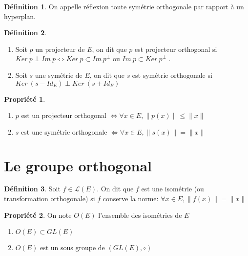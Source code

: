 \documentclass[fleqn]{article}
\theoremstyle{definition} \newtheorem*{defi}{D\'efinition}
\theoremstyle{definition} \newtheorem*{theo}{Th\'eor\`eme}
\theoremstyle{definition} \newtheorem*{coro}{Corollaire}
\theoremstyle{remark} \newtheorem*{rqs}{Remarques}
\theoremstyle{definition} \newtheorem*{prop}{Propri\'et\'e}
\begin{document}
\begin{defi}
	On appelle r\'eflexion toute sym\'etrie orthogonale par rapport \`a un hyperplan.
\end{defi}

\begin{defi} $ $
	\begin{enumerate}
		\item Soit $p$ un projecteur de $E$, on dit que $p$ est projecteur orthogonal si $Ker\ p \perp Im\  p \Leftrightarrow Ker\ p
			\subset Im\ p^\perp$ ou $ Im\ p \subset Ker\ p^\perp$ .
		\item Soit $s$ une sym\'etrie de $E$, on dit que $s$ est sym\'etrie orthogonale si $Ker\ (s-Id_E) \perp Ker\ (s + Id_E)$
	\end{enumerate}
\end{defi}

\begin{prop} $ $
	\begin{enumerate}
		\item $p$ est un projecteur orthogonal $\Leftrightarrow \forall x \in E, \|p(x)\| \leq \|x\|$
		\item $s$ est une sym\'etrie orthogonale $\Leftrightarrow \forall x \in E, \|s(x)\| = \|x\|$
	\end{enumerate}
\end{prop}

\section{Le groupe orthogonal}

\begin{defi}
	Soit $f \in \mathscr{L}(E)$. On dit que $f$ est une isom\'etrie (ou transformation orthogonale) si $f$ conserve la norme: $\forall x \in E,
	\|f(x)\| = \|x\|$
\end{defi}

\begin{prop} On note $O(E)$ l'ensemble des isom\'etries de $E$
	\begin{enumerate}
		\item $O(E) \subset GL(E)$
		\item $O(E)$ est un sous groupe de $(GL(E),\circ)$
	\end{enumerate}
\end{prop}
\end{document}
